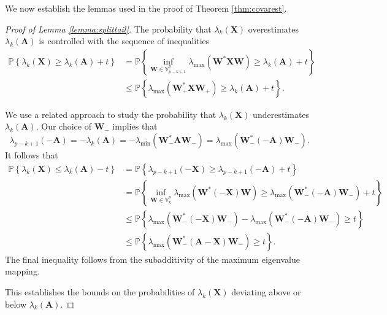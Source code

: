 \documentclass[11pt,letterpaper,twoside,reqno,nosumlimits]{amsart}
\newcommand{\mat}[1]{\ensuremath{\bm{#1}}} %
\newcommand{\Prob}[1]{\ensuremath{\mathbb{P}\left\{#1\right\}}}
\newcommand{\lambdamax}[1]{\ensuremath{\lambda_{\mathrm{max}}\left(#1\right)}}
\newcommand{\lambdamin}[1]{\ensuremath{\lambda_{\mathrm{min}}\left(#1\right)}}
\newcommand{\Isom}[2]{\ensuremath{\mathbb{V}_{#1}^{#2}}}
\theoremstyle{remark}
\numberwithin{equation}{section}
\numberwithin{thm}{section}
\numberwithin{prop}{section}
\numberwithin{defn}{section}
\numberwithin{remark}{section}
\begin{document}
We now establish the lemmas used in the proof of Theorem \ref{thm:covarest}.

\begin{proof}[Proof of Lemma \ref{lemma:splittail}]
The probability that $\lambda_k(\mat{X})$ overestimates $\lambda_k(\mat{A})$ is controlled with the sequence of inequalities
\begin{align*}
\Prob{\lambda_k(\mat{X}) \geq \lambda_k(\mat{A}) + t} & = \Prob{ \inf_{\mat{W} \in \Isom{p-k+1}{p}} \lambdamax{\mat{W}^*\mat{X}\mat{W}} \geq \lambda_k(\mat{A}) + t} \\
& \leq \Prob{\lambdamax{\mat{W}_+^*\mat{X}\mat{W}_+} \geq \lambda_k(\mat{A}) + t}. 
\end{align*}

We use a related approach to study the probability that $\lambda_k(\mat{X})$ underestimates $\lambda_k(\mat{A}).$ Our choice of $\mat{W}_-$ implies that 
\[
\lambda_{p-k+1}(-\mat{A}) = -\lambda_k(\mat{A}) = -\lambdamin{\mat{W}_-^*\mat{A}\mat{W}_-} = \lambdamax{\mat{W}_-^*(-\mat{A})\mat{W}_-}. 
\]
It follows that
\begin{align*}
\Prob{\lambda_k(\mat{X}) \leq \lambda_k(\mat{A}) - t} & = \Prob{\lambda_{p-k+1}(-\mat{X}) \geq \lambda_{p-k+1}(-\mat{A}) + t} \\
& = \Prob{ \inf_{\mat{W} \in \Isom{k}{p}} \lambdamax{\mat{W}^*(-\mat{X})\mat{W}} \geq \lambdamax{\mat{W}_-^*(-\mat{A})\mat{W}_-} + t} \\
& \leq \Prob{\lambdamax{\mat{W}_-^*(-\mat{X})\mat{W}_-} - \lambdamax{\mat{W}_-^*(-\mat{A})\mat{W}_-} \geq t} \\
& \leq \Prob{\lambdamax{\mat{W}_-^*(\mat{A} - \mat{X})\mat{W}_-} \geq t}. 
\end{align*}
The final inequality follows from the subadditivity of the maximum eigenvalue mapping. 

This establishes the bounds on the probabilities of $\lambda_k(\mat{X})$ deviating above or below $\lambda_k(\mat{A}).$
\end{proof}
\end{document}
